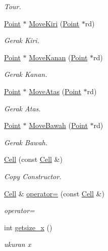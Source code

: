 \begin{DoxyCompactItemize}
\begin{DoxyCompactList}\small\item\em Tour. \end{DoxyCompactList}\item 
\hyperlink{class_point}{Point} $\ast$ \hyperlink{class_cell_a63ecfd5bb08d406d8e5013e4d2db7955}{Move\+Kiri} (\hyperlink{class_point}{Point} $\ast$rd)
\begin{DoxyCompactList}\small\item\em Gerak Kiri. \end{DoxyCompactList}\item 
\hyperlink{class_point}{Point} $\ast$ \hyperlink{class_cell_aaac410ea21c5122487bced757a4ccf05}{Move\+Kanan} (\hyperlink{class_point}{Point} $\ast$rd)
\begin{DoxyCompactList}\small\item\em Gerak Kanan. \end{DoxyCompactList}\item 
\hyperlink{class_point}{Point} $\ast$ \hyperlink{class_cell_af7e08776a9089ee75485afa99cf9741a}{Move\+Atas} (\hyperlink{class_point}{Point} $\ast$rd)
\begin{DoxyCompactList}\small\item\em Gerak Atas. \end{DoxyCompactList}\item 
\hyperlink{class_point}{Point} $\ast$ \hyperlink{class_cell_a7ec49234304539b9b74ed6b76d5417e4}{Move\+Bawah} (\hyperlink{class_point}{Point} $\ast$rd)
\begin{DoxyCompactList}\small\item\em Gerak Bawah. \end{DoxyCompactList}\item 
\hyperlink{class_cell_a8ca000885181236a713963c5c8bdb46f}{Cell} (const \hyperlink{class_cell}{Cell} \&)
\begin{DoxyCompactList}\small\item\em Copy Constructor. \end{DoxyCompactList}\item 
\hyperlink{class_cell}{Cell} \& \hyperlink{class_cell_a42eb7226a9c960006f78f73d6a04f091}{operator=} (const \hyperlink{class_cell}{Cell} \&)
\begin{DoxyCompactList}\small\item\em operator= \end{DoxyCompactList}\item 
int \hyperlink{class_cell_acd37e1d8a072393bdaa4a12354f1eec2}{getsize\+\_\+x} ()
\begin{DoxyCompactList}\small\item\em ukuran x \end{DoxyCompactList}\item 

\end{DoxyCompactItemize}
